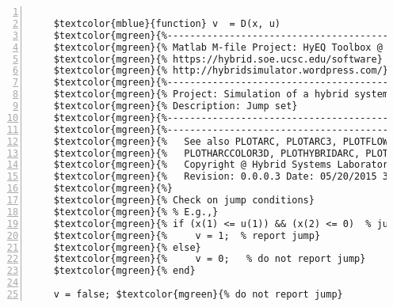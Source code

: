 %  
%  
%  
%  
  
  
\DefineShortVerb[fontfamily=courier,fontseries=m]{\$} 
\DefineShortVerb[fontfamily=courier,fontseries=b]{\#} 
  
\begin{Verbatim}[commandchars=\$\{\},numbers=left,numbersep=2pt] 

    $textcolor{mblue}{function} v  = D(x, u)  
    $textcolor{mgreen}{%--------------------------------------------------------------------------} 
    $textcolor{mgreen}{% Matlab M-file Project: HyEQ Toolbox @  Hybrid Systems Laboratory (HSL), } 
    $textcolor{mgreen}{% https://hybrid.soe.ucsc.edu/software} 
    $textcolor{mgreen}{% http://hybridsimulator.wordpress.com/} 
    $textcolor{mgreen}{%--------------------------------------------------------------------------} 
    $textcolor{mgreen}{% Project: Simulation of a hybrid system} 
    $textcolor{mgreen}{% Description: Jump set} 
    $textcolor{mgreen}{%--------------------------------------------------------------------------} 
    $textcolor{mgreen}{%--------------------------------------------------------------------------} 
    $textcolor{mgreen}{%   See also PLOTARC, PLOTARC3, PLOTFLOWS, PLOTHARC, PLOTHARCCOLOR,} 
    $textcolor{mgreen}{%   PLOTHARCCOLOR3D, PLOTHYBRIDARC, PLOTJUMPS.} 
    $textcolor{mgreen}{%   Copyright @ Hybrid Systems Laboratory (HSL),} 
    $textcolor{mgreen}{%   Revision: 0.0.0.3 Date: 05/20/2015 3:42:00} 
    $textcolor{mgreen}{%} 
    $textcolor{mgreen}{% Check on jump conditions} 
    $textcolor{mgreen}{% % E.g.,} 
    $textcolor{mgreen}{% if (x(1) <= u(1)) && (x(2) <= 0)  % jump condition} 
    $textcolor{mgreen}{%     v = 1;  % report jump} 
    $textcolor{mgreen}{% else} 
    $textcolor{mgreen}{%     v = 0;   % do not report jump} 
    $textcolor{mgreen}{% end} 
     
    v = false; $textcolor{mgreen}{% do not report jump}  
\end{Verbatim}  
  
\UndefineShortVerb{\$} 
\UndefineShortVerb{\#} 
 